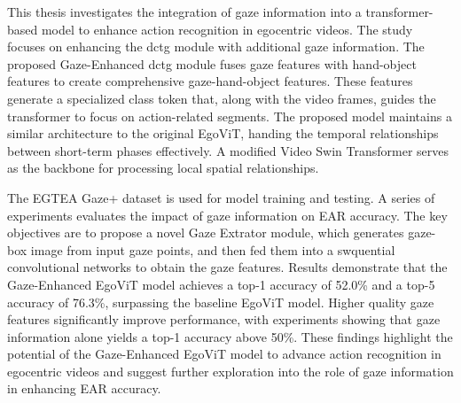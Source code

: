 This thesis investigates the integration of gaze information into a transformer-based model to enhance action recognition in egocentric videos. The study focuses on enhancing the \acrlong{dctg} module with additional gaze information.
The proposed Gaze-Enhanced \gls{dctg} module fuses gaze features with hand-object features to create comprehensive gaze-hand-object features. These features generate a specialized class token that, along with the video frames, guides the transformer to focus on action-related segments. 
The proposed model maintains a similar architecture to the original EgoViT, handing the temporal relationships between short-term phases effectively. A modified Video Swin Transformer serves as the backbone for processing local spatial relationships.

The EGTEA Gaze+ dataset is used for model training and testing. A series of experiments evaluates the impact of gaze information on EAR accuracy. The key objectives are to propose a novel Gaze Extrator module, which generates gaze-box image from input gaze points, and then fed them into a swquential convolutional networks to obtain the gaze features. Results demonstrate that the Gaze-Enhanced EgoViT model achieves a top-1 accuracy of 52.0\% and a top-5 accuracy of 76.3\%, surpassing the baseline EgoViT model. Higher quality gaze features significantly improve performance, with experiments showing that gaze information alone yields a top-1 accuracy above 50\%. These findings highlight the potential of the Gaze-Enhanced EgoViT model to advance action recognition in egocentric videos and suggest further exploration into the role of gaze information in enhancing EAR accuracy.


